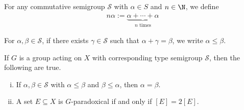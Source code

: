 \begin{definition}
  For any commutative semigroup $\mathcal{S}$ with $\alpha \in S$ and $n\in \N$, we define
  \begin{align*}
    n\alpha := \underbrace{\alpha + \cdots + \alpha}_{\text{$n$ times}}
  \end{align*}
\end{definition}
\begin{definition}
  For $\alpha,\beta \in \mathcal{S}$, if there exists $\gamma \in \mathcal{S}$ such that $\alpha + \gamma = \beta$, we write $\alpha \leq \beta$.
\end{definition}
\begin{fact}\label{fact:type_semigroup_paradoxicality}
  If $G$ is a group acting on $X$ with corresponding type semigroup $\mathcal{S}$, then the following are true.
  \begin{enumerate}[(i)]
    \item If $\alpha,\beta\in \mathcal{S}$ with $\alpha \leq \beta$ and $\beta \leq \alpha$, then $\alpha = \beta$.
    \item A set $E\subseteq X$ is $G$-paradoxical if and only if $\left[E\right] = 2\left[E\right]$.
  \end{enumerate}
\end{fact}
